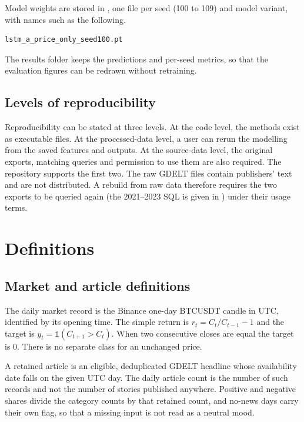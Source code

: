 Model weights are stored in , one file per seed (100 to 109) and model variant, with names such as the following.
\begin{lstlisting}[basicstyle=\ttfamily\footnotesize,backgroundcolor=\color{codegray},breaklines=true,frame=single]
lstm_a_price_only_seed100.pt
\end{lstlisting} The results folder keeps the predictions and per-seed metrics, so that the evaluation figures can be redrawn without retraining.

\subsection{Levels of reproducibility}
Reproducibility can be stated at three levels. At the code level, the methods exist as executable files. At the processed-data level, a user can rerun the modelling from the saved features and outputs. At the source-data level, the original exports, matching queries and permission to use them are also required. The repository supports the first two. The raw GDELT files contain publishers' text and are not distributed. A rebuild from raw data therefore requires the two exports to be queried again (the 2021--2023 SQL is given in ) under their usage terms.

\section{Definitions}
\label{app:definitions}
\subsection{Market and article definitions}
The daily market record is the Binance one-day BTCUSDT candle in UTC, identified by its opening time. The simple return is $r_t=C_t/C_{t-1}-1$ and the target is $y_t=\mathbb{1}(C_{t+1}>C_t)$. When two consecutive closes are equal the target is 0. There is no separate class for an unchanged price.

A retained article is an eligible, deduplicated GDELT headline whose availability date falls on the given UTC day. The daily article count is the number of such records and not the number of stories published anywhere. Positive and negative shares divide the category counts by that retained count, and no-news days carry their own flag, so that a missing input is not read as a neutral mood.

